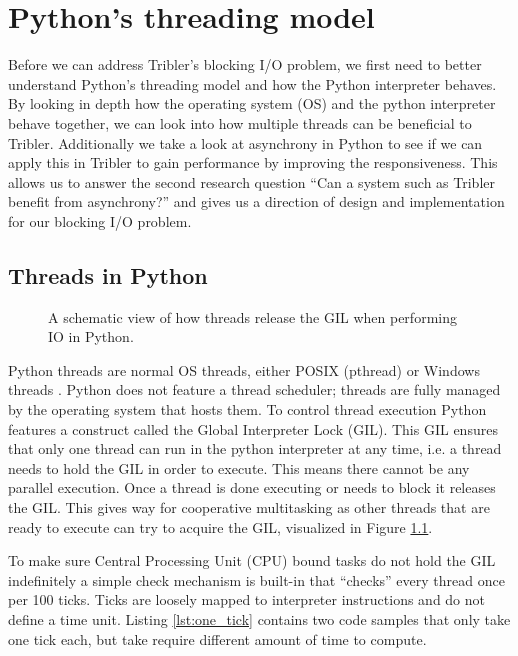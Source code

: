 \chapter{Python's threading model}
\label{cpt:pythons_thread_model}

Before we can address Tribler's blocking I/O problem, we first need to better understand Python's threading model and how the Python interpreter behaves.
By looking in depth how the operating system (OS) and the python interpreter behave together, we can look into how multiple threads can be beneficial to Tribler.
Additionally we take a look at asynchrony in Python to see if we can apply this in Tribler to gain performance by improving the responsiveness.
This allows us to answer the second research question \enquote{Can a system such as Tribler benefit from asynchrony?} and gives us a direction of design and implementation for our blocking I/O problem.

\section{Threads in Python}

\begin{figure}[!h]
	\caption{A schematic view of how threads release the GIL when performing IO in Python.}
	\label{fig:python_threads_release_gil}
\end{figure}

Python threads are normal OS threads, either POSIX (pthread) or Windows threads \cite{beazley2010understanding, beazley2009inside}.
Python does not feature a thread scheduler; threads are fully managed by the operating system that hosts them.
To control thread execution Python features a construct called the Global Interpreter Lock (GIL).
This GIL ensures that only one thread can run in the python interpreter at any time, i.e. a thread needs to hold the GIL in order to execute.
This means there cannot be any parallel execution.
Once a thread is done executing or needs to block it releases the GIL.
This gives way for cooperative multitasking as other threads that are ready to execute can try to acquire the GIL, visualized in Figure \ref{fig:python_threads_release_gil}.

To make sure Central Processing Unit (CPU) bound tasks do not hold the GIL indefinitely a simple check mechanism is built-in that \enquote{checks} every thread once per 100 ticks.
Ticks are loosely mapped to interpreter instructions and do not define a time unit.
Listing \ref{lst:one_tick} contains two code samples that only take one tick each, but take require different amount of time to compute.

